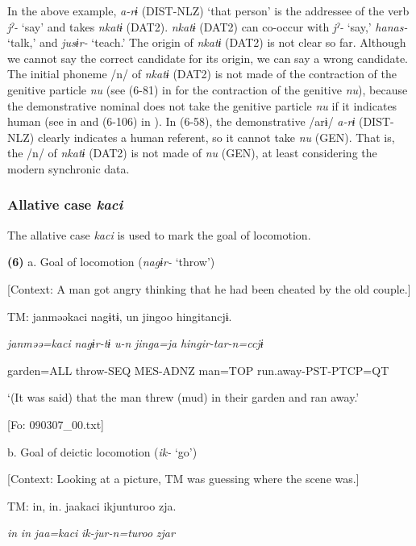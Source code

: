 In the above example, \textit{a-rɨ} (DIST-NLZ) ‘that person’ is the addressee of the verb \textit{jˀ-} ‘say’ and takes \textit{nkatɨ} (DAT2). \textit{nkatɨ} (DAT2) can co-occur with \textit{jˀ-} ‘say,’ \textit{hanas-} ‘talk,’ and \textit{jusɨr-} ‘teach.’ The origin of \textit{nkatɨ} (DAT2) is not clear so far. Although we cannot say the correct candidate for its origin, we can say a wrong candidate. The initial phoneme /n/ of \textit{nkatɨ} (DAT2) is not made of the contraction of the genitive particle \textit{nu} (see (6-81) in  for the contraction of the genitive \textit{nu}), because the demonstrative nominal does not take the genitive particle \textit{nu} if it indicates human (see  in  and (6-106) in ). In (6-58), the demonstrative /arɨ/ \textit{a-rɨ} (DIST-NLZ) clearly indicates a human referent, so it cannot take \textit{nu} (GEN). That is, the /n/ of \textit{nkatɨ} (DAT2) is not made of \textit{nu} (GEN), at least considering the modern synchronic data.

\subsubsection{Allative case \textit{kaci}}

The allative case \textit{kaci} is used to mark the goal of locomotion.

\textbf{(6)}  a.  Goal of locomotion (\textit{nagɨr-} ‘throw’)

    [Context: A man got angry thinking that he had been cheated by the old couple.]

    TM:  janməəkaci  nagɨtɨ,  un  jingoo  hingitancjɨ.

      \textit{janməə=kaci}  \textit{nagɨr-tɨ}  \textit{u-n}  \textit{jinga=ja}  \textit{hingir-tar-n=ccjɨ}

      garden=ALL  throw-SEQ  MES-ADNZ  man=TOP  run.away-PST-PTCP=QT

      ‘(It was said) that the man threw (mud) in their garden and ran away.’

      [Fo: 090307\_00.txt]

  b.  Goal of deictic locomotion (\textit{ik-} ‘go’)

    [Context: Looking at a picture, TM was guessing where the scene was.]

    TM:  in,  in.  jaakaci  ikjunturoo  zja.

      \textit{in}  \textit{in}  \textit{jaa=kaci}  \textit{ik-jur-n=turoo}  \textit{zjar}

